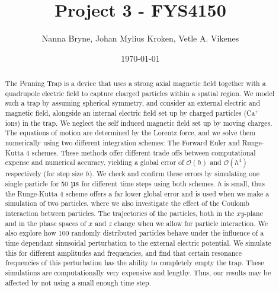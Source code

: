 



\title{Project 3 - FYS4150} 
\author{Nanna Bryne, Johan Mylius Kroken, Vetle A. Vikenes} 
\date{\today}                             
\noaffiliation                            

\begin{abstract}
    The Penning Trap is a device that uses a strong axial magnetic field together with a quadrupole electric field to capture charged particles within a spatial region. We model such a trap by assuming spherical symmetry, and consider an external electric and magnetic field, alongside an internal electric field set up by charged particles (Ca$^+$ ions) in the trap. We neglect the self induced magnetic field set up by moving charges. The equations of motion are determined by the Lorentz force, and we solve them numerically using two different integration schemes: The Forward Euler and Runge-Kutta 4 schemes. These methods offer different trade offs between computational expense and numerical accuracy, yielding a global error of $\mathcal{O}(h)$ and $\mathcal{O}(h^4)$ respectively (for step size $h$). We check and confirm these errors by simulating one single particle for 50 $\mus$ for different time steps using both schemes. $h$ is small, thus the Runge-Kutta 4 scheme offers a far lower global error and is used when we make a simulation of two particles, where we also investigate the effect of the Coulomb interaction between particles. The trajectories of the particles, both in the $xy$-plane and in the phase spaces of $x$ and $z$ change when we allow for particle interaction. We also explore how 100 randomly distributed particles behave under the influence of a time dependant sinusoidal perturbation to the external electric potential. We simulate this for different amplitudes and frequencies, and find that certain resonance frequencies of this perturbation has the ability to completely empty the trap. These simulations are computationally very expensive and lengthy. Thus, our results may be affected by not using a small enough time step. 
\end{abstract}
\maketitle














 



